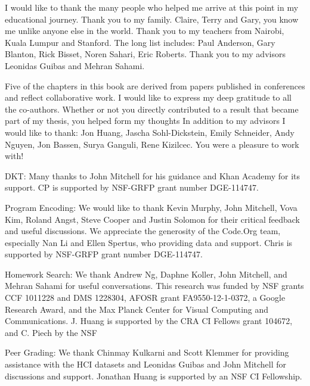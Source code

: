 I would like to thank the many people who helped me arrive at this point in my educational journey. Thank you to my family. Claire, Terry and Gary, you know me unlike anyone else in the world. Thank you to my teachers from Nairobi, Kuala Lumpur and Stanford. The long list includes: Paul Anderson, Gary Blanton, Rick Bisset, Noren Sahari, Eric Roberts. Thank you to my advisors Leonidas Guibas and Mehran Sahami. 

Five of the chapters in this book are derived from papers published in conferences and reflect collaborative work. I would like to express my deep gratitude to all the co-authors. Whether or not you directly contributed to a result that became part of my thesis, you helped form my thoughts In addition to my advisors I would like to thank: Jon Huang, Jascha Sohl-Dickstein, Emily Schneider, Andy Nguyen, Jon Bassen, Surya Ganguli, Rene Kizilcec. You were a pleasure to work with!

DKT:
Many thanks to John Mitchell for his guidance and Khan Academy for its support. CP is supported by NSF-GRFP grant number DGE-114747.

Program Encoding:
We would like to thank Kevin Murphy, John Mitchell, Vova Kim, Roland Angst, Steve Cooper and Justin Solomon for their critical feedback and useful discussions. We appreciate the generosity of the Code.Org team, especially Nan Li and Ellen Spertus, who providing data and support. Chris is supported by NSF-GRFP grant number DGE-114747.

Homework Search:
We thank Andrew Ng, Daphne Koller, John Mitchell, and Mehran Sahami for 
useful conversations.
This research was funded by
NSF grants CCF 1011228 and  DMS 1228304, AFOSR grant FA9550-12-1-0372,  a Google Research Award, and the Max Planck Center for Visual Computing and Communications.
J. Huang is supported by the CRA CI Fellows grant 104672, and C. Piech by the NSF

Peer Grading:
We thank Chinmay Kulkarni and Scott Klemmer for providing assistance with the HCI datasets and Leonidas Guibas and John Mitchell
for discussions and support. Jonathan Huang is supported by an NSF 
CI Fellowship.